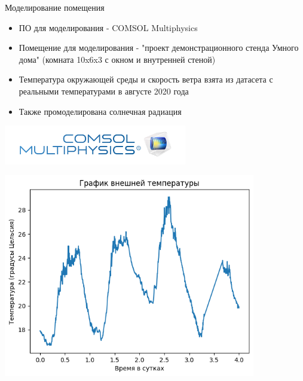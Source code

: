 \documentclass[14pt,aspectratio=169,hyperref={pdftex,unicode},xcolor=dvipsnames]{beamer}
\begin{document}
\begin{frame}{Моделирование помещения}
\small
\begin{itemize}
\item ПО для моделирования - COMSOL Multiphysics
\item Помещение для моделирования - "проект демонстрационного стенда Умного дома" (комната 10x6x3 с окном и внутренней стеной)
\item Температура окружающей среды и скорость ветра взята из датасета с реальными температурами в августе 2020 года
\item Также промоделирована солнечная радиация
\end{itemize}

\begin{center}
\includegraphics[width=8cm]{images/logo_comsol.png}
\end{center}

\end{frame}



\begin{frame} \begin{center}
\includegraphics[width=11cm]{images/temperature_plot.png}
\end{center} \end{frame}
\end{document}
